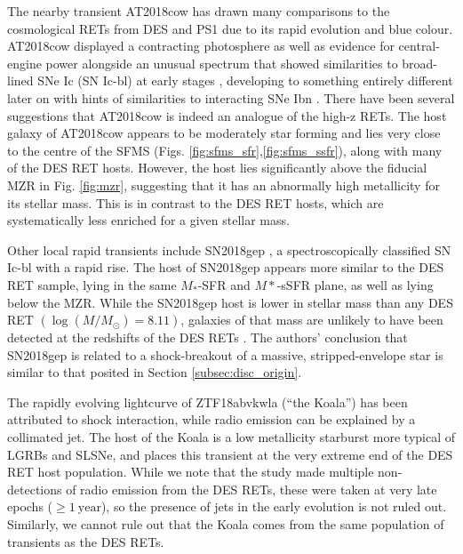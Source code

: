 \documentclass[fleqn,usenatbib,]{mnras}
\begin{document}
The nearby transient AT2018cow has drawn many comparisons to the cosmological RETs from DES and PS1 \citep[e.g.][]{Perley2019,Margutti2019,Fox2019,Mohan2020} due to its rapid evolution and blue colour. AT2018cow displayed a contracting photosphere as well as evidence for central-engine power alongside an unusual spectrum that showed similarities to broad-lined SNe Ic (SN Ic-bl) at early stages \citep[e.g.][]{Xu2018,Izzo2018} , developing to something entirely different later on \citep{Perley2019} with hints of similarities to interacting SNe Ibn \citep{Fox2019}. There have been several suggestions that AT2018cow is indeed an analogue of the high-z RETs. The host galaxy of AT2018cow appears to be moderately star forming and lies very close to the centre of the SFMS (Figs. \ref{fig:sfms_sfr},\ref{fig:sfms_ssfr}), along with many of the DES RET hosts. However, the host lies significantly above the fiducial MZR in Fig. \ref{fig:mzr}, suggesting that it has an abnormally high metallicity for its stellar mass. This is in contrast to the DES RET hosts, which are systematically less enriched for a given stellar mass. 

Other local rapid transients include SN2018gep \citep{Ho2019}, a spectroscopically classified SN Ic-bl with a rapid rise. The host of SN2018gep appears more similar to the DES RET sample, lying in the same $M_*$-SFR and $M*$-sSFR plane, as well as lying below the MZR. While the SN2018gep host is lower in stellar mass than any DES RET $\left(\log \left(M/M_{\odot}\right) =8.11\right)$, galaxies of that mass are unlikely to have been detected at the redshifts of the DES RETs \citep{Wiseman2020}. The authors' conclusion that SN2018gep is related to a shock-breakout of a massive, stripped-envelope star is similar to that posited in Section \ref{subsec:disc_origin}. 

The rapidly evolving lightcurve of ZTF18abvkwla (``the Koala'') has been attributed to shock interaction, while radio emission can be explained by a collimated jet. The host of the Koala is a low metallicity starburst more typical of LGRBs and SLSNe, and places this transient at the very extreme end of the DES RET host population. While we note that the \citet{Ho2020} study made multiple non-detections of radio emission from the DES RETs, these were taken at very late epochs ($\geq 1~\mathrm{year}$), so the presence of jets in the early evolution is not ruled out. Similarly, we cannot rule out that the Koala comes from the same population of transients as the DES RETs.
\end{document}
